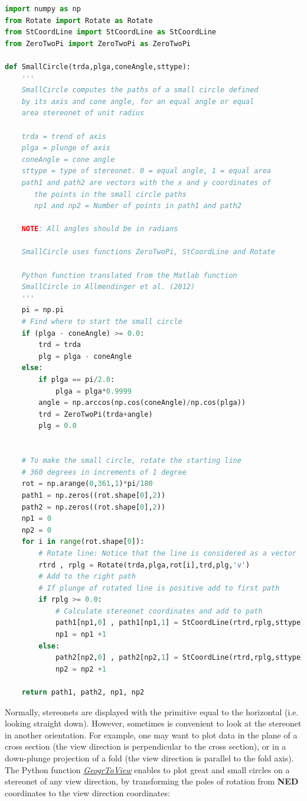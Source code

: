 \documentclass[a4paper , 12pt]{book}
\begin{document}
\begin{lstlisting}[language=Python, frame=single]
import numpy as np
from Rotate import Rotate as Rotate
from StCoordLine import StCoordLine as StCoordLine
from ZeroTwoPi import ZeroTwoPi as ZeroTwoPi

def SmallCircle(trda,plga,coneAngle,sttype):
    '''
	SmallCircle computes the paths of a small circle defined 
	by its axis and cone angle, for an equal angle or equal 
	area stereonet of unit radius
	
	trda = trend of axis
	plga = plunge of axis
	coneAngle = cone angle
	sttype = type of stereonet. 0 = equal angle, 1 = equal area
	path1 and path2 are vectors with the x and y coordinates of 
       the points in the small circle paths
       np1 and np2 = Number of points in path1 and path2
       
    NOTE: All angles should be in radians

	SmallCircle uses functions ZeroTwoPi, StCoordLine and Rotate

	Python function translated from the Matlab function 	
	SmallCircle in Allmendinger et al. (2012)
	'''
    pi = np.pi
	# Find where to start the small circle
    if (plga - coneAngle) >= 0.0:
        trd = trda
        plg = plga - coneAngle
    else:
        if plga == pi/2.0:
            plga = plga*0.9999
        angle = np.arccos(np.cos(coneAngle)/np.cos(plga))
        trd = ZeroTwoPi(trda+angle)
        plg = 0.0
    
    
	# To make the small circle, rotate the starting line 
	# 360 degrees in increments of 1 degree
    rot = np.arange(0,361,1)*pi/180
    path1 = np.zeros((rot.shape[0],2))
    path2 = np.zeros((rot.shape[0],2))
    np1 = 0
    np2 = 0
    for i in range(rot.shape[0]):
        # Rotate line: Notice that the line is considered as a vector
        rtrd , rplg = Rotate(trda,plga,rot[i],trd,plg,'v')
        # Add to the right path
        # If plunge of rotated line is positive add to first path
        if rplg >= 0.0:
            # Calculate stereonet coordinates and add to path
            path1[np1,0] , path1[np1,1] = StCoordLine(rtrd,rplg,sttype)
            np1 = np1 +1
        else:
            path2[np2,0] , path2[np2,1] = StCoordLine(rtrd,rplg,sttype)
            np2 = np2 +1
    
    return path1, path2, np1, np2
\end{lstlisting}

Normally, stereonets are displayed with the primitive equal to the horizontal (i.e. looking straight down). However, sometimes is convenient to look at the stereonet in another orientation. For example, one may want to plot data in the plane of a cross section (the view direction is perpendicular to the cross section), or in a down-plunge projection of a fold (the view direction is parallel to the fold axis). The Python function \href{http://github.com}{\textit{GeogrToView}} enables to plot great and small circles on a stereonet of any view direction, by transforming the poles of rotation from \textbf{NED} coordinates to the view direction coordinates:
\end{document}
